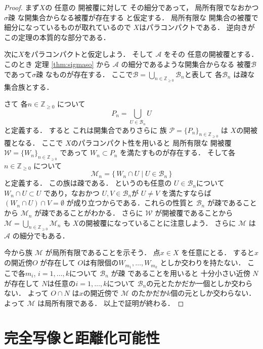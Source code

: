 \documentclass[leqno, a4paper, 12pt]{jsarticle}
\newcommand{\zz}{\mathbb{Z}}
\begin{document}
\begin{proof}
まず$X$の
任意の
開被覆に対して
その細分であって，
局所有限でなおかつ
$\sigma$疎
な開集合からなる被覆が存在する
と仮定する．
局所有限な
開集合の被覆で細分になっているものが取れているので
$X$はパラコンパクトである．
逆向きがこの定理の本質的な部分である．

次に$X$をパラコンパクトと仮定しよう．
そして
$\mathcal{A}$
をその
任意の開被覆とする．
このとき
定理
\ref{thm:sigmaso}
から
$\mathcal{A}$
の細分であるような開集合からなる
被覆$\mathcal{B}$であって$\sigma$疎
なものが存在する．
ここで$\mathcal{B}=\bigcup_{n\in \zz_{\ge 0}}\mathcal{B}_{n}$と表して
各$\mathcal{B}_{n}$
は疎な集合族とする．

さて
各$n\in \zz_{\ge 0}$
について
\[
P_{n}
=\bigcup_{U\in \mathcal{B}_{n}}U
\]
と定義する．
すると
これは開集合でありさらに
族
$\mathcal{P}=\{P_{n}\}_{n\in \zz_{\ge 0}}$
は
$X$の開被覆となる．
ここで
$X$のパラコンパクト性を用いると
局所有限な
開被覆
$\mathcal{W}=\{W_{n}\}_{n\in \zz_{\ge 0}}$
であって
$W_{n}\subset P_{n}$
を満たすものが存在する．
そして各$n\in \zz_{\ge 0}$
について
\[
\mathcal{M}_{n}=\{\, W_{n}\cap U\mid U\in \mathcal{B}_{n} \, \}
\]
と定義する．
この族は疎である．
というのも任意の
$U\in \mathcal{B}_{n}$について
$W_{n}\cap U\subset U$
であり，なおかつ
$U, V\in \mathcal{B}_{n}$が
$U\neq V$
を満たすならば
$(W_{n}\cap U)\cap V=\emptyset$
が成り立つからである．これらの性質と
$\mathcal{B}_{n}$
が疎であることから
$\mathcal{M}_{n}$
が疎であることがわかる．
さらに
$\mathcal{W}$
が開被覆であることから
$\mathcal{M}=\bigcup_{n\in \zz_{\ge 0}}\mathcal{M}_{n}$
も
$X$の開被覆になっていることに注意しよう．
さらに
$\mathcal{M}$
は$\mathcal{A}$
の細分でもある．

今から族
$\mathcal{M}$
が局所有限であることを示そう．
点$x\in X$
を任意にとる．
すると$x$の開近傍$O$
が存在して
$O$は有限個の$W_{m_{1}}, \dots, W_{m_{k}}$
としか交わりを持たない．
ここで各$m_{i}$, $i=1, \dots, k$について
$\mathcal{B}_{n}$
が疎
であることを用いると
十分小さい近傍
$N$が存在して
$N$は任意の$i=1, \dots, k$について
$\mathcal{B}_{n}$の元とたかだか一個としか交わらない．
よって
$O\cap N$
は$x$の開近傍で
$\mathcal{M}$
のたかだか$k$個の元としか交わらない．
よって
$\mathcal{M}$
は局所有限である．
以上で証明が終わる．
\end{proof}



\section{完全写像と距離化可能性}\label{sec:perfect}
\end{document}
